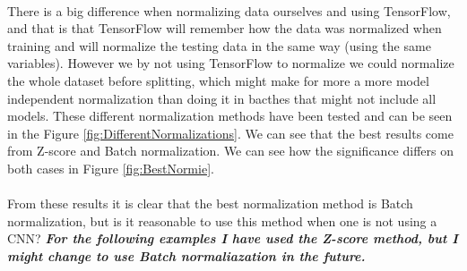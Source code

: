 \documentclass[14pt, a4paper]{book}
\begin{document}
\\There is a big difference when normalizing data ourselves and using TensorFlow, and that is that TensorFlow will remember how the data was normalized when training and will normalize the testing data in the same way (using the same variables). However we by not using TensorFlow to normalize we could normalize the whole dataset before splitting, which might make for more a more model independent normalization than doing it in bacthes that might not include all models.
These different normalization methods have been tested and can be seen in the Figure \ref{fig:DifferentNormalizations}. 
We can see that the best results come from Z-score and Batch normalization. We can see how the significance differs on both cases in Figure \ref{fig:BestNormie}.\\
\\From these results it is clear that the best normalization method is Batch normalization, but is it reasonable to use this method when one is not using a CNN? \textit{\textbf{For the following examples I have used the Z-score method, but I might change to use Batch normaliazation in the future.}}
\graphicspath{{../../../Plots/TESTING/NeuralNetwork/NORMALIZATIONS/}}
\end{document}
